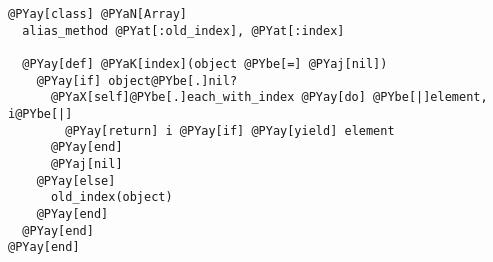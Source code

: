 \begin{Verbatim}[commandchars=@\[\]]
@PYay[class] @PYaN[Array]
  alias_method @PYat[:old_index], @PYat[:index]

  @PYay[def] @PYaK[index](object @PYbe[=] @PYaj[nil])
    @PYay[if] object@PYbe[.]nil?
      @PYaX[self]@PYbe[.]each_with_index @PYay[do] @PYbe[|]element, i@PYbe[|]
        @PYay[return] i @PYay[if] @PYay[yield] element
      @PYay[end]
      @PYaj[nil]
    @PYay[else]
      old_index(object)
    @PYay[end]
  @PYay[end]
@PYay[end]
\end{Verbatim}
